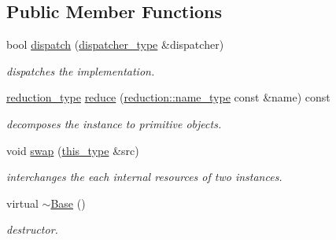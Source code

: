 \subsection*{Public Member Functions}
\begin{DoxyCompactItemize}
\item 
\hypertarget{classhryky_1_1http_1_1header_1_1cache_1_1directive_1_1_base_aef756d94ec270c120024d1f04176851d}{bool \hyperlink{classhryky_1_1http_1_1header_1_1cache_1_1directive_1_1_base_aef756d94ec270c120024d1f04176851d}{dispatch} (\hyperlink{classhryky_1_1http_1_1header_1_1cache_1_1directive_1_1dispatcher_1_1_base}{dispatcher\-\_\-type} \&dispatcher)}\label{classhryky_1_1http_1_1header_1_1cache_1_1directive_1_1_base_aef756d94ec270c120024d1f04176851d}

\begin{DoxyCompactList}\small\item\em dispatches the implementation. \end{DoxyCompactList}\item 
\hypertarget{classhryky_1_1http_1_1header_1_1cache_1_1directive_1_1_base_a2809ad5f75abd2266e6804e90094bc05}{\hyperlink{namespacehryky_a343a9a4c36a586be5c2693156200eadc}{reduction\-\_\-type} \hyperlink{classhryky_1_1http_1_1header_1_1cache_1_1directive_1_1_base_a2809ad5f75abd2266e6804e90094bc05}{reduce} (\hyperlink{namespacehryky_1_1reduction_ac686c30a4c8d196bbd0f05629a6b921f}{reduction\-::name\-\_\-type} const \&name) const }\label{classhryky_1_1http_1_1header_1_1cache_1_1directive_1_1_base_a2809ad5f75abd2266e6804e90094bc05}

\begin{DoxyCompactList}\small\item\em decomposes the instance to primitive objects. \end{DoxyCompactList}\item 
\hypertarget{classhryky_1_1http_1_1header_1_1cache_1_1directive_1_1_base_ab2b137d16fbe40d839ee136bd5304cab}{void \hyperlink{classhryky_1_1http_1_1header_1_1cache_1_1directive_1_1_base_ab2b137d16fbe40d839ee136bd5304cab}{swap} (\hyperlink{classhryky_1_1http_1_1header_1_1cache_1_1directive_1_1_base_a9bbcc0e5a77bd95f0b2482502287720e}{this\-\_\-type} \&src)}\label{classhryky_1_1http_1_1header_1_1cache_1_1directive_1_1_base_ab2b137d16fbe40d839ee136bd5304cab}

\begin{DoxyCompactList}\small\item\em interchanges the each internal resources of two instances. \end{DoxyCompactList}\item 
\hypertarget{classhryky_1_1http_1_1header_1_1cache_1_1directive_1_1_base_a722da881b6c70cfcbde9243abcfbf334}{virtual \hyperlink{classhryky_1_1http_1_1header_1_1cache_1_1directive_1_1_base_a722da881b6c70cfcbde9243abcfbf334}{$\sim$\-Base} ()}\label{classhryky_1_1http_1_1header_1_1cache_1_1directive_1_1_base_a722da881b6c70cfcbde9243abcfbf334}

\begin{DoxyCompactList}\small\item\em destructor. \end{DoxyCompactList}\end{DoxyCompactItemize}
